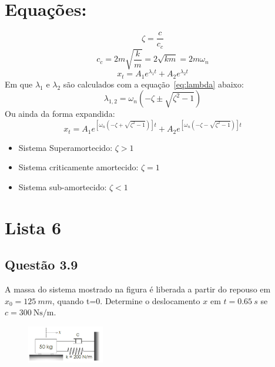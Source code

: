 

\section{Equações:}%
\begin{equation}\label{eq:zeta}
\zeta=\frac{c}{c_{c}}
\end{equation}
\begin{equation}\label{eq:Cc}
c_{c}=2 m \sqrt{\frac{k}{m}}=2 \sqrt{k m}=2 m \omega_{n}
\end{equation}
\begin{equation}\label{eq:xt}
    x_{t}=A_{1} e^{\lambda_{1} t}+A_{2} e^{\lambda_{2} t}
\end{equation}
Em que $\lambda_1$ e $\lambda_2$ são calculados com a equação~\ref{eq:lambda}
abaixo:
\begin{equation}\label{eq:lambda}
\lambda_{1,2}=\omega_{n}\left(-\zeta\pm \sqrt{\zeta^{2}-1}\right)
\end{equation}
Ou ainda da forma expandida:
\begin{equation}\label{eq:xt_expandida}
x_{t}=A_{1} e^{\left[\omega_{n}(-\zeta+\sqrt{\zeta^{2}-1})\right] t}+A_{2} e^{\left[\omega_{n}(-\zeta-\sqrt{\zeta^{2}-1})\right] t}
\end{equation}

\begin{itemize}
    \item Sistema Superamortecido: $\zeta > 1$
    \item Sistema criticamente amortecido: $\zeta = 1$
    \item Sistema sub-amortecido: $\zeta < 1$
\end{itemize}


\section{Lista 6}
\subsection{Questão 3.9}
A massa do sistema mostrado na figura é liberada a partir do repouso em $x_0 =
\SI{125}{mm}$, quando t=0. Determine o deslocamento $x $ em $t=\SI{0,65}{s}$ se
$c=\SI{300}{\newton\second\per\meter}$.
\begin{figure}[ht]
    \centering
    \includegraphics[width=0.3\textwidth]{imagens/questao_3.9.png}
    \label{fig:questao_3_9}
\end{figure}

